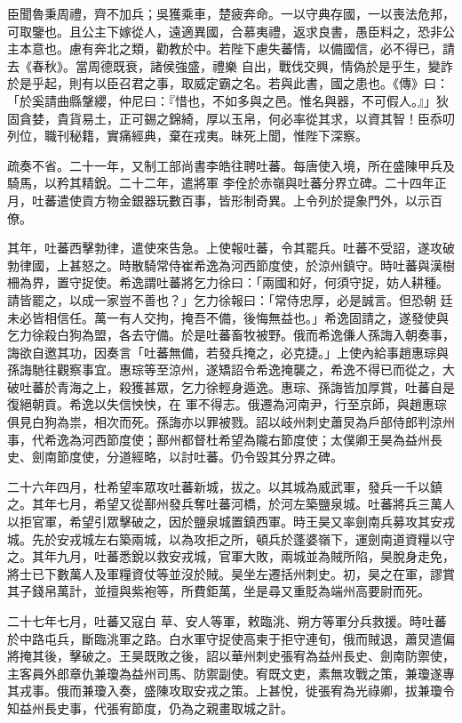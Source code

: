 \begin{pinyinscope}
 臣聞魯秉周禮，齊不加兵；吳獲乘車，楚疲奔命。一以守典存國，一以喪法危邦，可取鑒也。且公主下嫁從人，遠適異國，合慕夷禮，返求良書，愚臣料之，恐非公主本意也。慮有奔北之類，勸教於中。若陛下慮失蕃情，以備國信，必不得已，請去《春秋》。當周德既衰，諸侯強盛，禮樂
 自出，戰伐交興，情偽於是乎生，變詐於是乎起，則有以臣召君之事，取威定霸之名。若與此書，國之患也。《傳》曰：「於奚請曲縣鞶纓，仲尼曰：『惜也，不如多與之邑。惟名與器，不可假人。』」狄固貪婪，貴貨易土，正可錫之錦綺，厚以玉帛，何必率從其求，以資其智！臣忝叨列位，職刊秘籍，實痛經典，棄在戎夷。昧死上聞，惟陛下深察。



 疏奏不省。二十一年，又制工部尚書李皓往聘吐蕃。每唐使入境，所在盛陳甲兵及騎馬，以矜其精銳。二十二年，遣將軍
 李佺於赤嶺與吐蕃分界立碑。二十四年正月，吐蕃遣使貢方物金銀器玩數百事，皆形制奇異。上令列於提象門外，以示百僚。



 其年，吐蕃西擊勃律，遣使來告急。上使報吐蕃，令其罷兵。吐蕃不受詔，遂攻破勃律國，上甚怒之。時散騎常侍崔希逸為河西節度使，於涼州鎮守。時吐蕃與漢樹柵為界，置守捉使。希逸謂吐蕃將乞力徐曰：「兩國和好，何須守捉，妨人耕種。請皆罷之，以成一家豈不善也？」乞力徐報曰：「常侍忠厚，必是誠言。但恐朝
 廷未必皆相信任。萬一有人交拘，掩吾不備，後悔無益也。」希逸固請之，遂發使與乞力徐殺白狗為盟，各去守備。於是吐蕃畜牧被野。俄而希逸傔人孫誨入朝奏事，誨欲自邀其功，因奏言「吐蕃無備，若發兵掩之，必克捷。」上使內給事趙惠琮與孫誨馳往觀察事宜。惠琮等至涼州，遂矯詔令希逸掩襲之，希逸不得已而從之，大破吐蕃於青海之上，殺獲甚眾，乞力徐輕身遁逸。惠琮、孫誨皆加厚賞，吐蕃自是復絕朝貢。希逸以失信怏怏，在
 軍不得志。俄遷為河南尹，行至京師，與趙惠琮俱見白狗為祟，相次而死。孫誨亦以罪被戮。詔以岐州刺史蕭炅為戶部侍郎判涼州事，代希逸為河西節度使；鄯州都督杜希望為隴右節度使；太僕卿王昊為益州長史、劍南節度使，分道經略，以討吐蕃。仍令毀其分界之碑。



 二十六年四月，杜希望率眾攻吐蕃新城，拔之。以其城為威武軍，發兵一千以鎮之。其年七月，希望又從鄯州發兵奪吐蕃河橋，於河左築鹽泉城。吐蕃將兵三萬人
 以拒官軍，希望引眾擊破之，因於鹽泉城置鎮西軍。時王昊又率劍南兵募攻其安戎城。先於安戎城左右築兩城，以為攻拒之所，頓兵於蓬婆嶺下，運劍南道資糧以守之。其年九月，吐蕃悉銳以救安戎城，官軍大敗，兩城並為賊所陷，昊脫身走免，將士已下數萬人及軍糧資仗等並沒於賊。昊坐左遷括州刺史。初，昊之在軍，謬賞其子錢帛萬計，並擅與紫袍等，所費鉅萬，坐是尋又重貶為端州高要尉而死。



 二十七年七月，吐蕃又寇白
 草、安人等軍，敕臨洮、朔方等軍分兵救援。時吐蕃於中路屯兵，斷臨洮軍之路。白水軍守捉使高柬于拒守連旬，俄而賊退，蕭炅遣偏將掩其後，擊破之。王昊既敗之後，詔以華州刺史張宥為益州長史、劍南防禦使，主客員外郎章仇兼瓊為益州司馬、防禦副使。宥既文吏，素無攻戰之策，兼瓊遂專其戎事。俄而兼瓊入奏，盛陳攻取安戎之策。上甚悅，徙張宥為光祿卿，拔兼瓊令知益州長史事，代張宥節度，仍為之親畫取城之計。




\end{pinyinscope}
